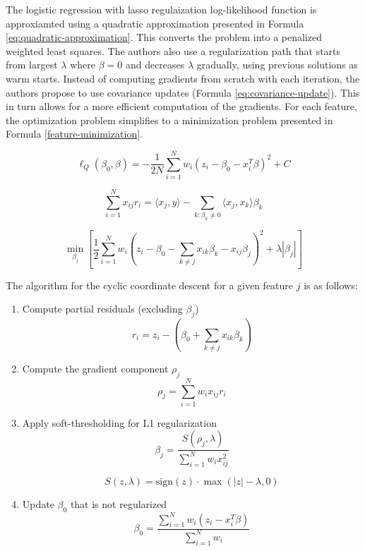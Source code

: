 \documentclass[12pt]{article}
\begin{document}
The logistic regression with lasso regulaization log-likelihood function is approxiamted using a quadratic approximation presented in Formula \ref{eq:quadratic-approximation}. This converts the problem into a penalized weighted least squares. The authors also use a regularization path that starts from largest $\lambda$ where $\beta = 0$ and decreases $\lambda$ gradually, using previous solutions as warm starts. Instead of computing gradients from scratch with each iteration, the authors propose to use covariance updates (Formula \ref{eq:covariance-update}). This in turn allows for a more efficient computation of the gradients. For each feature, the optimization problem simplifies to a minimization problem presented in Formula \ref{feature-minimization}.

\begin{equation}\label{eq:quadratic-approximation}
\ell_Q(\beta_0, \beta) = -\frac{1}{2N} \sum_{i=1}^{N} w_i (z_i - \beta_0 - x_i^T \beta)^2 + C
\end{equation}


\begin{equation}\label{eq:covariance-update}
\sum_{i=1}^{N} x_{ij} r_i = \langle x_j, y \rangle - \sum_{k: \beta_k \neq 0} \langle x_j, x_k \rangle \beta_k
\end{equation}

\begin{equation}\label{eq:feature-minimization}
    \min_{\beta_j} \left[ \frac{1}{2} \sum_{i=1}^{N} w_i \left( z_i - \beta_0 - \sum_{k \neq j} x_{ik} \beta_k - x_{ij} \beta_j \right)^2 + \lambda |\beta_j| \right]
\end{equation}


The algorithm for the cyclic coordinate descent for a given feature $j$ is as follows:
\begin{enumerate}
    \item Compute partial residuals (excluding $\beta_j$)
    $$
    r_i = z_i - (\beta_0 + \sum_{k \neq j} x_{ik} \beta_k)
    $$
    \item Compute the gradient component $\rho_j$
    $$
    \rho_j = \sum_{i=1}^{N} w_i x_{ij} r_i
    $$
    \item Apply soft-thresholding for L1 regularization
    $$
    \beta_j = \frac{S(\rho_j, \lambda)}{\sum_{i=1}^{N} w_i x_{ij}^2}
    $$
 
    $$
    S(z, \lambda) = \text{sign}(z) \cdot \max(|z| - \lambda, 0)
    $$
    \item Update $\beta_0$ that is not regularized
    $$
\beta_0 = \frac{\sum_{i=1}^{N} w_i (z_i - x_i^T \beta)}{\sum_{i=1}^{N} w_i}
$$

\end{enumerate}
\end{document}

